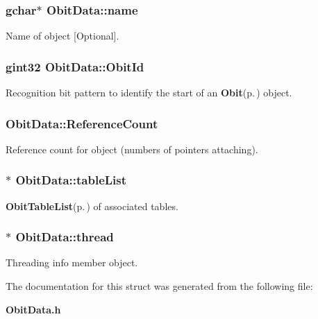 \subsubsection{\setlength{\rightskip}{0pt plus 5cm}gchar$\ast$ {\bf Obit\-Data::name}}\label{structObitData_o3}


Name of object [Optional]. 

\subsubsection{\setlength{\rightskip}{0pt plus 5cm}gint32 {\bf Obit\-Data::Obit\-Id}}\label{structObitData_o0}


Recognition bit pattern to identify the start of an {\bf Obit}{\rm (p.\,\pageref{structObit})} object. 

\subsubsection{ {\bf Obit\-Data::Reference\-Count}}\label{structObitData_o2}


Reference count for object (numbers of pointers attaching). 

\subsubsection{$\ast$ {\bf Obit\-Data::table\-List}}\label{structObitData_o9}


{\bf Obit\-Table\-List}{\rm (p.\,\pageref{structObitTableList})} of associated tables. 

\subsubsection{$\ast$ {\bf Obit\-Data::thread}}\label{structObitData_o4}


Threading info member object. 



The documentation for this struct was generated from the following file:\begin{CompactItemize}
\item 
{\bf Obit\-Data.h}\end{CompactItemize}
